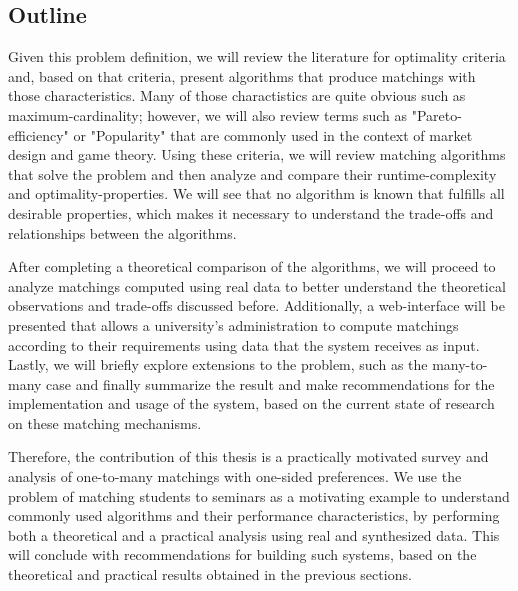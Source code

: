 \subsection{Outline}
Given this problem definition, we will review the literature for optimality criteria and, based on that criteria, present algorithms that produce matchings with those characteristics. Many of those charactistics are quite obvious such as maximum-cardinality; however, we will also review terms such as "Pareto-efficiency" or "Popularity" that are commonly used in the context of market design and game theory. 
Using these criteria, we will review matching algorithms that solve the problem and then analyze and compare their runtime-complexity and optimality-properties. We will see that no algorithm is known that fulfills all desirable properties, which makes it necessary to understand the trade-offs and relationships between the algorithms. 

After completing a theoretical comparison of the algorithms, we will proceed to analyze matchings computed using real data to better understand the theoretical observations and trade-offs discussed before. Additionally, a web-interface will be presented that allows a university's administration to compute matchings according to their requirements using data that the system receives as input. Lastly, we will briefly explore extensions to the problem, such as the many-to-many case and finally summarize the result and make recommendations for the implementation and usage of the system, based on the current state of research on these matching mechanisms.

Therefore, the contribution of this thesis is a practically motivated survey and analysis of one-to-many matchings with one-sided preferences. We use the problem of matching students to seminars as a motivating example to understand commonly used algorithms and their performance characteristics, by performing both a theoretical and a practical analysis using real and synthesized data. This will conclude with recommendations for building such systems, based on the theoretical and practical results obtained in the previous sections. 

